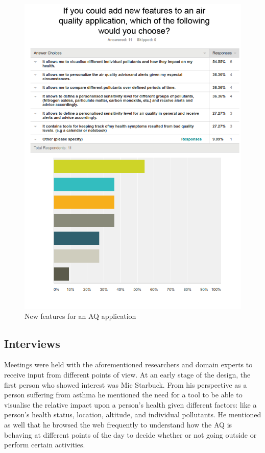 \begin{figure}[H]
\begin{adjustbox}{width=1\textwidth,center=\textwidth}
  \centering
  \includegraphics[scale=1]{images/new_features.png}
\end{adjustbox}
  \caption[New features for an AQ application]{New features for an AQ application}
  \label{fig:survey_new_features}
\end{figure}

\subsection{Interviews}

Meetings were held with the aforementioned researchers and domain experts to receive input from different points of view. At an early stage of the design, the first person who showed interest was Mic Starbuck. From his perspective as a person suffering from asthma he mentioned the need for a tool to be able to visualise the relative impact upon a person's health given different factors: like a person's health status, location, altitude, and individual pollutants. He mentioned as well that he browsed the web frequently to understand how the AQ is behaving at different points of the day to decide whether or not going outside or perform certain activities. 

